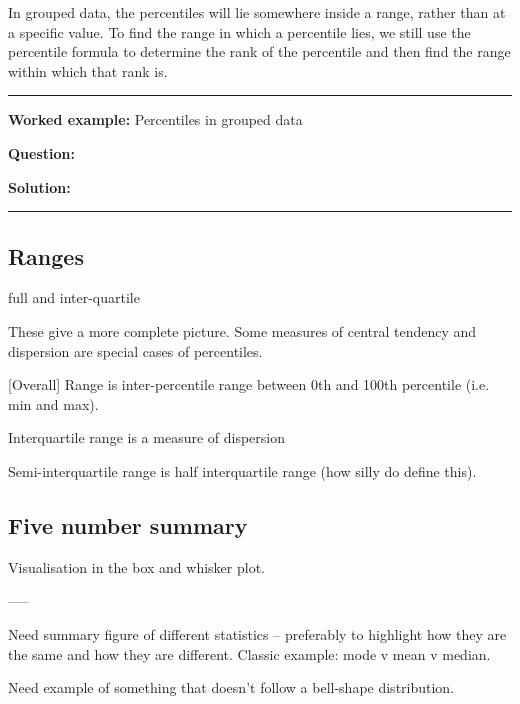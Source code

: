 \documentclass[a4paper,11pt]{report}
\newenvironment{wex}[3]%
{\rule{\linewidth}{0.5mm}
\textbf{Worked example:} #1

\textbf{Question:} #2

\textbf{Solution:} #3}%
{\rule{\linewidth}{0.5mm}}
\begin{document}
In grouped data, the percentiles will lie somewhere inside a range,
rather than at a specific value. To find the range in which a
percentile lies, we still use the percentile formula to determine the
rank of the percentile and then find the range within which that rank
is.

\begin{wex}{Percentiles in grouped data}{

}{
}
\end{wex}

\subsection{Ranges}
 full and inter-quartile

These give a more complete picture. Some measures of central tendency
and dispersion are special cases of percentiles.

[Overall] Range is inter-percentile range between 0th and 100th
percentile (i.e. min and max).

Interquartile range is a measure of dispersion

Semi-interquartile range is half interquartile range (how silly do
define this).

\subsection{Five number summary}

Visualisation in the box and whisker plot.

-----

Need summary figure of different statistics -- preferably to highlight
how they are the same and how they are different. Classic example:
mode v mean v median.

Need example of something that doesn't follow a bell-shape distribution.
\end{document}
